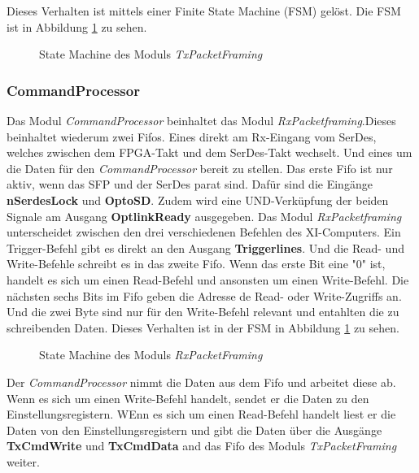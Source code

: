 \documentclass{article}
\begin{document}
Dieses Verhalten ist mittels einer Finite State Machine (FSM) gelöst. Die FSM ist in Abbildung \ref{fig:fsm_tx_packet_framing} zu sehen.

\begin{figure}[tb]
    \caption{State Machine des Moduls \textit{TxPacketFraming}}
    \label{fig:fsm_tx_packet_framing}
\end{figure}

\subsubsection*{CommandProcessor}
Das Modul \textit{CommandProcessor} beinhaltet das Modul \textit{RxPacketframing}.Dieses beinhaltet wiederum zwei Fifos. Eines direkt am Rx-Eingang vom SerDes, welches zwischen dem FPGA-Takt und dem SerDes-Takt wechselt. Und eines um die Daten für den \textit{CommandProcessor} bereit zu stellen. Das erste Fifo ist nur aktiv, wenn das SFP und der SerDes parat sind. Dafür sind die Eingänge \textbf{nSerdesLock} und \textbf{OptoSD}. Zudem wird eine UND-Verküpfung der beiden Signale am Ausgang \textbf{OptlinkReady} ausgegeben. Das Modul \textit{RxPacketframing} unterscheidet zwischen den drei verschiedenen Befehlen des XI-Computers. Ein Trigger-Befehl gibt es direkt an den Ausgang \textbf{Triggerlines}. Und die Read- und Write-Befehle schreibt es in das zweite Fifo. Wenn das erste Bit eine "0" ist, handelt es sich um einen Read-Befehl und ansonsten um einen Write-Befehl. Die nächsten sechs Bits im Fifo geben die Adresse de Read- oder Write-Zugriffs an. Und die zwei Byte sind nur für den Write-Befehl relevant und entahlten die zu schreibenden Daten. Dieses Verhalten ist in der FSM in Abbildung \ref{fig:fsm_tx_packet_framing} zu sehen.

\begin{figure}[tb]
    \caption{State Machine des Moduls \textit{RxPacketFraming}}
    \label{fig:fsm_rx_packet_framing}
\end{figure}

Der \textit{CommandProcessor} nimmt die Daten aus dem Fifo und arbeitet diese ab. Wenn es sich um einen Write-Befehl handelt, sendet er die Daten zu den Einstellungsregistern. WEnn es sich um einen Read-Befehl handelt liest er die Daten von den Einstellungsregistern und gibt die Daten über die Ausgänge \textbf{TxCmdWrite} und \textbf{TxCmdData} and das Fifo des Moduls \textit{TxPacketFraming} weiter.
\end{document}
